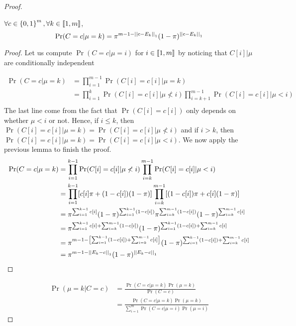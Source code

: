 \begin{proof}
\begin{lemma}
    \label{lemma:p_c_mu}
    $\forall c \in \left\{ 0, 1 \right\}^m, \forall k \in \left\llbracket1, m\right\rrbracket$,
    \[\Pr(C = c | \mu = k) = \pi^{m - 1 - \left|\left|c - E_k\right|\right|_1} (1 - \pi)^{\left|\left|c - E_k\right|\right|_1}\]
\end{lemma}
\begin{proof}
    Let us compute $\Pr(C = c| \mu = i)$ for $i \in \left\llbracket1, m\right\rrbracket$ by noticing that $C[i] | \mu$ are conditionally independent

    \begin{align}
        \Pr(C = c| \mu = k)
        &= \prod_{i = 1}^{m -1} \Pr(C[i] = c[i] | \mu = k)\\
        &= \prod_{i = 1}^{k} \Pr(C[i] = c[i] | \mu \not< i ) \prod_{i = k+1}^{m-1} \Pr(C[i] = c[i] | \mu < i)\\
    \end{align}
    The last line come from the fact that $\Pr(C[i] = c[i])$ only depends on whether $\mu < i$ or not. Hence, if $i \leq k$, then $\Pr(C[i] = c[i] | \mu = k) = \Pr(C[i] = c[i] | \mu \not< i)$ and if $i > k$, then $\Pr(C[i] = c[i] | \mu = k) = \Pr(C[i] = c[i] | \mu<i)$. We now apply the previous lemma to finish the proof.
    \begin{align}
        \Pr(C = c| \mu = k)
        &= \prod_{i = 1}^{k-1} \Pr(C[i] = c[i] | \mu \not< i) \prod_{i = k}^{m-1} \Pr(C[i] = c[i] | \mu < i)\\
        &= \prod_{i = 1}^{k-1} [c[i] \pi + (1 - c[i]) (1 - \pi)] \prod_{i = k}^{m-1} [(1 - c[i]) \pi + c[i] (1 - \pi)]\\
        &= \pi^{\sum_{i = 1}^{k-1} c[i]} (1 - \pi)^{\sum_{i = 1}^{k-1} (1 - c[i])} \pi^{\sum_{i = k}^{m-1} (1 - c[i])} (1 - \pi)^{\sum_{i = k}^{m-1} c[i]}\\
        &= \pi^{\sum_{i = 1}^{k-1} c[i] + \sum_{i = k}^{m-1} (1 - c[i])} (1 - \pi)^{\sum_{i = 1}^{k-1} (1 - c[i]) + \sum_{i = k}^{m-1} c[i]} \\
        &= \pi^{m - 1 - \left[\sum_{i = 1}^{k-1} (1 - c[i]) + \sum_{i = k}^{m -1} c[i] \right]} (1 - \pi)^{\sum_{i = 1}^{k-1} (1 - c[i]) + \sum_{i = k}^{m-1} c[i]}\\
        &= \pi^{m - 1 - \left|\left|E_k - c\right|\right|_1} (1 - \pi)^{\left|\left|E_k - c\right|\right|_1}
    \end{align}
\end{proof}


\begin{align}
    \Pr(\mu = k | C = c) 
    &= \frac{\Pr(C = c | \mu = k) \Pr(\mu = k)}{\Pr(C=c)}\\
    &= \frac{\Pr(C = c | \mu = k) \Pr(\mu = k)}{\sum_{i = 1}^m \Pr(C = c | \mu = i) \Pr(\mu = i)}
\end{align}


\end{proof}
